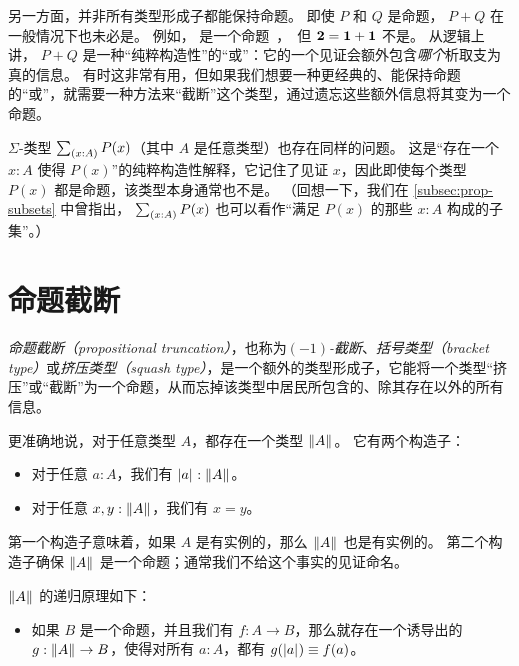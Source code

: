 另一方面，并非所有类型形成子都能保持命题。
即使 $P$ 和 $Q$ 是命题， $P+Q$ 在一般情况下也未必是。
例如， \unit 是一个命题，但 $\mathbf{2}=\mathbf{1}+\mathbf{1}$ 不是。
从逻辑上讲， $P+Q$ 是一种``纯粹构造性''的``或''：它的一个见证会额外包含\emph{哪个}析取支为真的信息。
有时这非常有用，但如果我们想要一种更经典的、能保持命题的``或''，就需要一种方法来``截断''这个类型，通过遗忘这些额外信息将其变为一个命题。

%
$\Sigma$-类型 $\sm{x:A} P(x)$（其中 $A$ 是任意类型）也存在同样的问题。
这是``存在一个 $x:A$ 使得 $P(x)$''的纯粹构造性解释，它记住了见证 $x$，因此即使每个类型 $P(x)$ 都是命题，该类型本身通常也不是。
（回想一下，我们在 \cref{subsec:prop-subsets} 中曾指出， $\sm{x:A} P(x)$ 也可以看作``满足 $P(x)$ 的那些 $x:A$ 构成的子集''。）

\section{命题截断}
\label{subsec:prop-trunc}

%
%
%
%
%
\emph{命题截断（propositional truncation）}，也称为\emph{$(-1)$-截断}、\emph{括号类型（bracket type）}或\emph{挤压类型（squash type）}，是一个额外的类型形成子，它能将一个类型``挤压''或``截断''为一个命题，从而忘掉该类型中居民所包含的、除其存在以外的所有信息。

更准确地说，对于任意类型 $A$，都存在一个类型 $\mathopen{}\left\Vert A\right\Vert_{}\mathclose{}$。
它有两个构造子：

\begin{itemize}
\item 对于任意 $a:A$，我们有 $\mathopen{}\left|a\right|_{}^{}\mathclose{} : \mathopen{}\left\Vert A\right\Vert_{}\mathclose{}$。
\item 对于任意 $x,y:\mathopen{}\left\Vert A\right\Vert_{}\mathclose{}$，我们有 $x=y$。
\end{itemize}

第一个构造子意味着，如果 $A$ 是有实例的，那么 $\mathopen{}\left\Vert A\right\Vert_{}\mathclose{}$ 也是有实例的。
第二个构造子确保 $\mathopen{}\left\Vert A\right\Vert_{}\mathclose{}$ 是一个命题；通常我们不给这个事实的见证命名。

%
$\mathopen{}\left\Vert A\right\Vert_{}\mathclose{}$ 的递归原理如下：

\begin{itemize}
\item 如果 $B$ 是一个命题，并且我们有 $f:A\to B$，那么就存在一个诱导出的 $g:\mathopen{}\left\Vert A\right\Vert_{}\mathclose{} \to B$，使得对所有 $a:A$，都有 $g(\mathopen{}\left|a\right|_{}^{}\mathclose{}) \equiv f(a)$。
\end{itemize}

